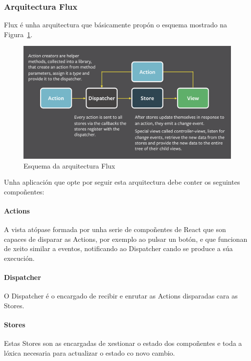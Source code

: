       \subsubsection{Arquitectura Flux}
      Flux\cite{book:flux} é unha arquitectura que básicamente propón o esquema 
mostrado na Figura~\ref{fig:img:flux}.

        \begin{figure}[h!]
          \begin{center}
          \includegraphics[width=\textwidth]{./img/flux.png}
          \caption{Esquema da arquitectura Flux}
          \label{fig:img:flux}
          \end{center}
        \end{figure}

      Unha aplicación que opte por seguir esta arquitectura debe conter os 
seguintes compoñentes:

        \paragraph{Actions}
        A vista atópase formada por unha serie de compoñentes de React que son 
capaces de disparar as Actions, por exemplo ao pulsar un botón, e que funcionan 
de xeito similar a eventos, notificando ao Dispatcher cando se produce a súa 
execución.
        \paragraph{Dispatcher}
        O Dispatcher é o encargado de recibir e enrutar as Actions disparadas 
cara as Stores.
        \paragraph{Stores}
        Estas Stores son as encargadas de xestionar o estado dos compoñentes e 
toda a lóxica necesaria para actualizar o estado co novo cambio.

